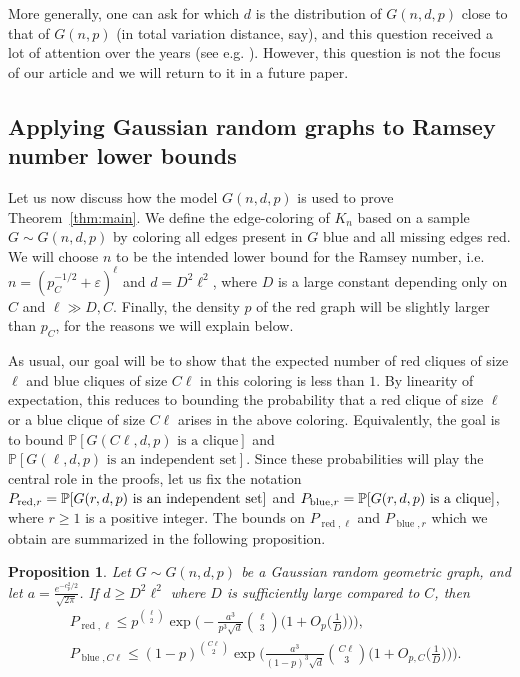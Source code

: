\documentclass[11pt]{amsart}
\newtheorem{proposition}[theorem]{\bf Proposition}
\theoremstyle{definition}
\def\eps{\varepsilon}
\def\Pb{\mathbb{P}}
\DeclareMathOperator{\red}{red}
\DeclareMathOperator{\blue}{blue}
\begin{document}
More generally, one can ask for which $d$ is the distribution of $G(n, d, p)$ close to that of $G(n, p)$ (in total variation distance, say), and this question received a lot of attention over the years (see e.g. \cite{BDER16}). However, this question is not the focus of our article and we will return to it in a future paper.

\subsection{Applying Gaussian random graphs to Ramsey number lower bounds}

Let us now discuss how the model $G(n, d, p)$ is used to prove Theorem~\ref{thm:main}. We define the edge-coloring of $K_n$ based on a sample $G\sim G(n, d, p)$ by coloring all edges present in $G$ blue and all missing edges red. We will choose $n$ to be the intended lower bound for the Ramsey number, i.e. $n=(p_C^{-1/2}+\eps)^\ell$ and $d=D^2\ell^2$, where $D$ is a large constant depending only on $C$ and $\ell \gg D, C$. Finally, the density $p$ of the red graph will be slightly larger than $p_C$, for the reasons we will explain below.

As usual, our goal will be to show that the expected number of red cliques of size $\ell$ and blue cliques of size $C\ell$ in this coloring is less than $1$. By linearity of expectation, this reduces to bounding the probability that a red clique of size $\ell$ or a blue clique of size $C\ell$ arises in the above coloring. Equivalently, the goal is to bound $\Pb[G(C\ell, d, p)\text{ is a clique}]$ and $\Pb[G(\ell, d, p)\text{ is an independent set}]$. Since these probabilities will play the central role in the proofs, let us fix the notation $P_{{\rm red}, r}=\Pb[G(r, d, p)\text{ is an independent set}]$ and $P_{{\rm blue}, r}=\Pb[G(r, d, p)\text{ is a clique}]$, where $r\geq 1$ is a positive integer. The bounds on $P_{\red, \ell}$ and $P_{\blue, r}$ which we obtain are summarized in the following proposition.

\begin{proposition}\label{prop:clique_probabilities}
Let $G\sim G(n, d, p)$ be a Gaussian random geometric graph, and let $a=\frac{e^{-c_p^2/2}}{\sqrt{2\pi}}$. If $d\geq D^2\ell^2$ where $D$ is sufficiently large compared to $C$, then
{\smaller[0.3]
\begin{align}
&P_{\red, \ell}\leq p^{\binom{\ell}{2}}\exp\bigg(-\frac{a^3}{p^3\sqrt{d}}\binom{\ell}{3}\Big(1+O_p\Big(\frac{1}{D}\Big)\Big)\bigg)\label{eq:clique_probabilities_red},\\
&P_{\blue, C\ell}\leq (1-p)^{\binom{C\ell}{2}}\exp\bigg(\frac{a^3}{(1-p)^3\sqrt{d}}\binom{C\ell}{3}\Big(1+O_{p, C}\Big(\frac{1}{D}\Big)\Big)\bigg)\label{eq:clique_probabilities_blue}.
\end{align}
}
\end{proposition}
\end{document}
